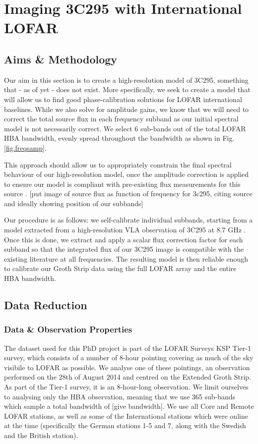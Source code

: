 \chapter{Imaging 3C295 with International LOFAR}
\minitoc
\section{Aims \& Methodology}
\pg
Our aim in this section is to create a high-resolution model of 3C295, something that - as
of yet - does not exist. More specifically, we seek to create a model that will allow us to find
good phase-calibration solutions for LOFAR international baselines. While we also solve for
amplitude gains, we know that we will need to correct the total source flux in each frequency
subband as our initial spectral model is not necessarily correct.
We select 6 sub-bands out of the total LOFAR HBA bandwidth, evenly spread throughout the bandwidth as shown in Fig. \ref{fig.freqsamp}.

\pg
This approach should allow us to appropriately constrain the final spectral behaviour of our high-resolution model, once the amplitude correction is applied to ensure our model is compliant with pre-existing flux measurements for this source . [put image of source flux as function of frequency for 3c295, citing source and ideally showing position of our subbands]

\pg
Our procedure is as follows: we self-calibrate individual subbands, starting from a model
extracted from a high-resolution VLA observation of 3C295 at 8.7 GHz . Once this is done,
we extract and apply a scalar flux correction factor for each subband so that the integrated flux of our 3C295 image is compatible with the existing literature at all frequencies. The resulting model is then reliable enough to calibrate our Groth Strip data using the full LOFAR array and the entire HBA bandwidth.

\section{Data Reduction}

\subsection{Data \& Observation Properties}
\pg
The dataset used for this PhD project is part of the LOFAR Surveys KSP Tier-1 survey, which consists of a number of 8-hour pointing covering as much of the sky visibile to LOFAR as possible. We analyse one of these pointings, an observation performed on the 28th of August 2014 and centred on the Extended Groth Strip. As part of the Tier-1 survey, it is an 8-hour-long observation. We limit ourselves to analysing only the HBA observation, meaning that we use 365 sub-bands which sample a total bandwidth of [give bandwidth]. We use all Core and Remote LOFAR stations, as well as some of the International stations which were online at the time (specifically the German stations 1-5 and 7, along with the Swedish and the British station).

